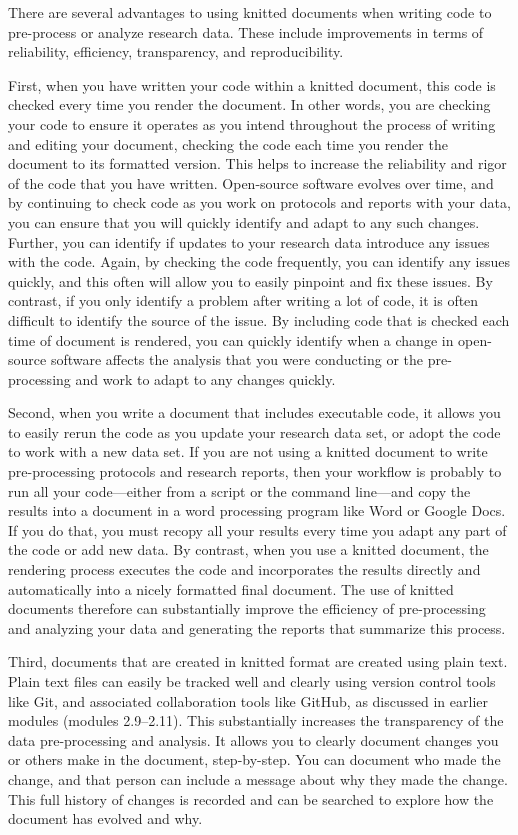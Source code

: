 \documentclass[]{tufte-book}
\begin{document}
There are several advantages to using knitted documents when writing code to
pre-process or analyze research data. These include improvements in terms of
reliability, efficiency, transparency, and reproducibility.

First, when you have written your code within a knitted document, this code is
checked every time you render the document. In other words, you are checking
your code to ensure it operates as you intend throughout the process of writing
and editing your document, checking the code each time you render the document
to its formatted version. This helps to increase the reliability and rigor of
the code that you have written. Open-source software evolves over time, and by
continuing to check code as you work on protocols and reports with your data,
you can ensure that you will quickly identify and adapt to any such changes.
Further, you can identify if updates to your research data introduce any issues
with the code. Again, by checking the code frequently, you can identify any
issues quickly, and this often will allow you to easily pinpoint and fix these
issues. By contrast, if you only identify a problem after writing a lot of code,
it is often difficult to identify the source of the issue. By including code
that is checked each time of document is rendered, you can quickly identify when
a change in open-source software affects the analysis that you were conducting
or the pre-processing and work to adapt to any changes quickly.

Second, when you write a document that includes executable code, it allows you
to easily rerun the code as you update your research data set, or adopt the code
to work with a new data set. If you are not using a knitted document to write
pre-processing protocols and research reports, then your workflow is probably to
run all your code---either from a script or the command line---and copy the
results into a document in a word processing program like Word or Google Docs.
If you do that, you must recopy all your results every time you adapt any part
of the code or add new data. By contrast, when you use a knitted document, the
rendering process executes the code and incorporates the results directly and
automatically into a nicely formatted final document. The use of knitted
documents therefore can substantially improve the efficiency of
pre-processing and analyzing your data and generating the reports that summarize
this process.

Third, documents that are created in knitted format are created using plain
text. Plain text files can easily be tracked well and clearly using version
control tools like Git, and associated collaboration tools like GitHub, as
discussed in earlier modules (modules 2.9--2.11). This substantially increases
the transparency of the data pre-processing and analysis. It allows you to
clearly document changes you or others make in the document, step-by-step. You
can document who made the change, and that person can include a message about
why they made the change. This full history of changes is recorded and can be
searched to explore how the document has evolved and why.
\end{document}
